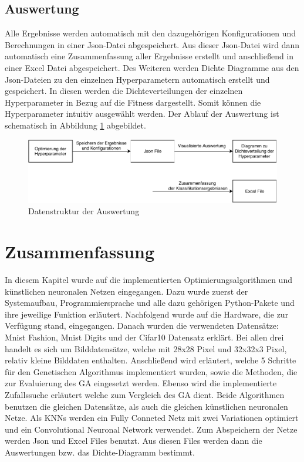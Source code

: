 \subsection{Auswertung}
Alle Ergebnisse werden automatisch mit den dazugehörigen Konfigurationen und Berechnungen in einer Json-Datei abgespeichert. Aus dieser Json-Datei wird dann automatisch eine Zusammenfassung aller Ergebnisse erstellt und anschließend in einer Excel Datei abgespeichert. Des Weiteren werden Dichte Diagramme aus den Json-Dateien zu den einzelnen Hyperparametern automatisch erstellt und gespeichert. In diesen werden die Dichteverteilungen der einzelnen Hyperparameter in Bezug auf die Fitness dargestellt. Somit können die Hyperparameter intuitiv ausgewählt werden. Der Ablauf der Auswertung ist schematisch in Abbildung \ref{fig:implementierung_auswertung} abgebildet. 

\begin{figure}[H]
  \centering  
  \includegraphics[scale=0.9]{img/Auswertung.pdf}
  \caption{Datenstruktur der Auswertung}
  \label{fig:implementierung_auswertung}
\end{figure}


\section{Zusammenfassung}
In diesem Kapitel wurde auf die implementierten Optimierungsalgorithmen und künstlichen neuronalen Netzen eingegangen. Dazu wurde zuerst der Systemaufbau, Programmiersprache und alle dazu gehörigen Python-Pakete und ihre jeweilige Funktion erläutert. Nachfolgend wurde auf die Hardware, die zur Verfügung stand, eingegangen. Danach wurden die verwendeten Datensätze: Mnist Fashion, Mnist Digits und der Cifar10 Datensatz erklärt. Bei allen drei handelt es sich um Bilddatensätze, welche mit 28x28 Pixel und 32x32x3 Pixel, relativ kleine Bilddaten enthalten. Anschließend wird erläutert, welche 5 Schritte für den Genetischen Algorithmus implementiert wurden, sowie die Methoden, die zur Evaluierung des GA eingesetzt werden. Ebenso wird die implementierte Zufallssuche erläutert welche zum Vergleich des GA dient. Beide Algorithmen benutzen die gleichen Datensätze, als auch die gleichen künstlichen neuronalen Netze. Als KNNs werden ein Fully Conneted Netz mit zwei Variationen optimiert und ein Convolutional Neuronal Network verwendet. Zum Abspeichern der Netze werden Json und Excel Files benutzt. Aus diesen Files werden dann die Auswertungen bzw. das Dichte-Diagramm bestimmt.